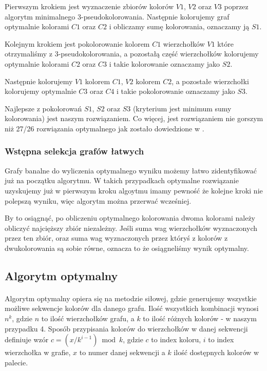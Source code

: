 \documentclass{article}
\begin{document}
Pierwszym krokiem jest wyznaczenie zbiorów kolorów $V1$, $V2$ oraz $V3$ poprzez algorytm minimalnego 3-pseudokolorowania. Następnie kolorujemy graf optymalnie kolorami $C1$ oraz $C2$ i obliczamy sumę kolorowania, oznaczamy ją $S1$. 

Kolejnym krokiem jest pokolorowanie kolorem $C1$ wierzchołków $V1$ które otrzymaliśmy z 3-pseudokolorowania, a pozostałą część wierzchołków kolorujemy optymalnie kolorami $C2$ oraz $C3$ i takie kolorowanie oznaczamy jako $S2$.

Następnie kolorujemy $V1$ kolorem $C1$, $V2$ kolorem $C2$, a pozostałe wierzchołki kolorujemy optymalnie $C3$ oraz $C4$ i takie pokolorowanie oznaczamy jako $S3$.

Najlepsze z pokolorowań $S1$, $S2$ oraz $S3$ (kryterium jest minimum sumy kolorowania) jest naszym rozwiązaniem. Co więcej, jest rozwiązaniem nie gorszym niż 27/26 rozwiązania optymalnego jak zostało dowiedzione w \cite{kubale-pikies19}.

\subsubsection*{Wstępna selekcja grafów łatwych}

Grafy banalne do wyliczenia optymalnego wyniku możemy łatwo zidentyfikować już na początku algorytmu. W takich przypadkach optymalne rozwiązanie uzyskujemy już w pierwszym kroku algoytmu imamy pewność że kolejne kroki nie polepszą wyniku, więc algorytm można przerwać wcześniej.

By to osiągnąć, po obliczeniu optymalnego kolorowania dwoma kolorami należy obliczyć najcięższy zbiór niezależny. Jeśli suma wag wierzchołków wyznaczonych przez ten zbiór, oraz suma wag wyznaczonych przez któryś z kolorów z dwukolorowania są sobie równe, oznacza to że osiągneliśmy wynik optymalny.

\subsection{Algorytm optymalny}

\paragraph{} Algorytm optymalny opiera się na metodzie siłowej, gdzie generujemy wszystkie możliwe sekwencje kolorów dla danego grafu. Ilość wszystkich kombinacji wynosi $n^k$, gdzie $n$ to ilość wierzchołków grafu, a $k$ to ilość różnych kolorów - w naszym przypadku 4. Sposób przypisania kolorów do wierzchołków w danej sekwencji definiuje wzór $c = (x / k^{i-1}) \bmod k$, gdzie $c$ to index koloru, $i$ to index wierzchołka w grafie, $x$ to numer danej sekwencji a $k$ ilość dostępnych kolorów w palecie. 
\end{document}

